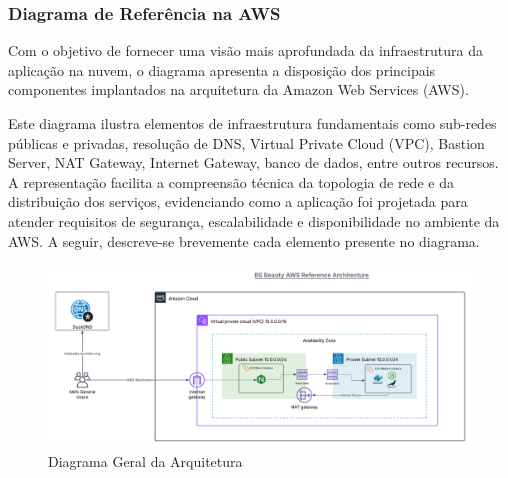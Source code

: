 \subsubsection{Diagrama de Referência na AWS}

Com o objetivo de fornecer uma visão mais aprofundada da infraestrutura da aplicação na nuvem, o diagrama apresenta a disposição dos principais componentes implantados na arquitetura da Amazon Web Services (AWS). 

Este diagrama ilustra elementos de infraestrutura fundamentais como sub-redes públicas e privadas, resolução de DNS, Virtual Private Cloud (VPC), Bastion Server, NAT Gateway, Internet Gateway, banco de dados, entre outros recursos. A representação facilita a compreensão técnica da topologia de rede e da distribuição dos serviços, evidenciando como a aplicação foi projetada para atender requisitos de segurança, escalabilidade e disponibilidade no ambiente da AWS. A seguir, descreve-se brevemente cada elemento presente no diagrama.

\begin{figure}[htb]
  \centering
  \includegraphics[width=\textwidth]{cap04-desenvolvimento/images/4-3-2-3-diagrama-geral}
  \caption{Diagrama Geral da Arquitetura}
  \label{fig:diagrama-geral}
\end{figure}

